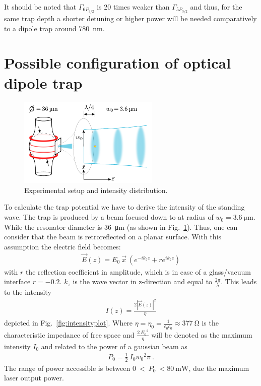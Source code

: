 It should be noted that \(\Gamma_{6P_{3/2}}\) is 20 times weaker than 
\(\Gamma_{5P_{3/2}}\) and thus, for the same trap depth a shorter detuning or 
higher power will be needed comparatively to a dipole trap around \SI{780}{\nano\meter}.

\section{Possible configuration of optical dipole trap} %

\begin{figure}[h]
    \centering
    \includegraphics[width=0.6\textwidth]{resonator_trap_label}
    \caption{\label{fig:resonator_trap_label} Experimental setup and intensity 
    distribution. }
\end{figure}
To calculate the trap potential we have to derive the intensity of the standing
wave. The trap is produced by a beam focused down to at radius of \(w_0 = 
\SI{3.6}{\micro\meter} \). While the resonator diameter is \SI{36}{\micro\meter}
(as shown in Fig.~\ref{fig:resonator_trap_label}). Thus, one can consider that
the beam is retroreflected on a planar surface. With this assumption the electric 
field becomes:
\begin{align}
    \vec{E}(z) = E_0~\vec{x}~\left( e^{-i k_z z} + r e^{i k_z z} \right)
\end{align}
with \(r \) the reflection coefficient in amplitude, which is in case of a 
glass/vacuum interface \(r = -0.2 \). \(k_z \) is the wave vector in z-direction 
and equal to \(\frac{2\pi}{\lambda} \). This leads to the intensity
\begin{align}
    I(z) = \frac{ { 2| \vec{E}(z) | }^2}{\eta}
\end{align}
depicted in Fig.~\ref{fig:intensityplot}. Where 
\(\eta = \eta_0 = \frac{1}{\epsilon_0 c_0} \approx \SI{377}{\ohm} \) is the 
characteristic impedance of free space and \(\frac{2~{E_0}^2}{\eta} \) will be 
denoted as the maximum intensity \(I_0 \) and related to the power of a gaussian 
beam as
\begin{align}
    P_0 = \frac{1}{2}~I_0 {w_0}^2 \pi~.
\end{align} 
The range of power accessible is between \(0~<~P_0~<\SI{80}{\milli\watt} \), due
the maximum laser output power. 

